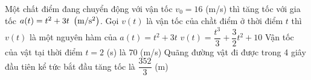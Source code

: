 \begin{ex}%
	Một chất điểm đang chuyển động với vận tốc $v_0=16$ (m/s) thì tăng tốc với gia tốc $a(t)=t^2+3t\,\,\left(\rm{m} / \rm{s}^2\right)$.
	\choiceTF
	{\True Gọi $v(t)$ là vận tốc của chầt điểm ở thời điểm $t$ thì $v(t)$ là một 	nguyên hàm của $a(t)=t^2+3t$}
	{$v(t)=\dfrac{t^3}{3}+\dfrac{3}{2} t^2+10$}
	{Vận tốc của vật tại thời điểm $t=2$ (s) là $70$ (m/s)}
	{\True Quãng đường vật đi được trong 4 giây đầu tiên kể tức bắt đầu tăng tốc là $\dfrac{352}{3}$ (m) }
\end{ex}

